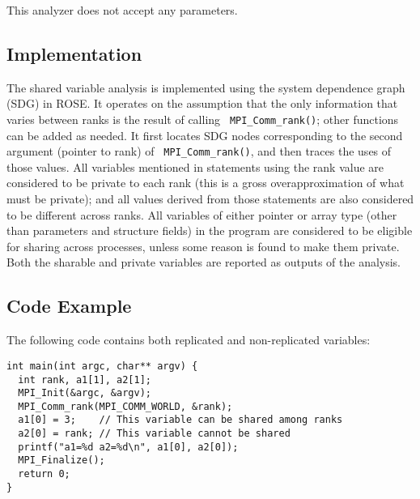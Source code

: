This analyzer does not accept any parameters.

\subsection{Implementation}

The shared variable analysis is implemented using the system dependence
graph (SDG) in ROSE.  It operates on the assumption that the only
information that varies between ranks is the result of calling {\tt
MPI\_Comm\_rank()}; other functions can be added as needed.  It first locates
SDG nodes corresponding to the second argument (pointer to rank) of {\tt
MPI\_Comm\_rank()}, and then traces the uses of those values.  All variables
mentioned in statements using the rank value are considered to be private
to each rank (this is a gross overapproximation of what must be private);
and all values derived from those statements are also considered to be
different across ranks.  All variables of either pointer or array type
(other than parameters and structure fields) in the program are considered
to be eligible for sharing across processes, unless some reason is found to
make them private.  Both the sharable and private variables are reported as
outputs of the analysis.

\subsection{Code Example}

The following code contains both replicated and non-replicated variables:

\begin{verbatim}
int main(int argc, char** argv) {
  int rank, a1[1], a2[1];
  MPI_Init(&argc, &argv);
  MPI_Comm_rank(MPI_COMM_WORLD, &rank);
  a1[0] = 3;    // This variable can be shared among ranks
  a2[0] = rank; // This variable cannot be shared
  printf("a1=%d a2=%d\n", a1[0], a2[0]);
  MPI_Finalize();
  return 0;
}
\end{verbatim}


